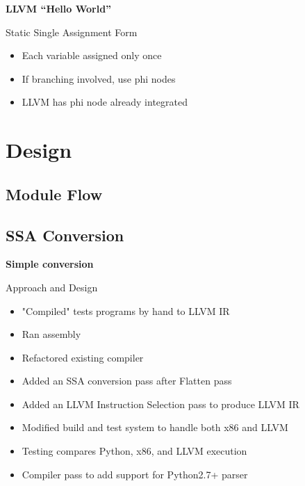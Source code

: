 \documentclass{beamer}
\begin{document}
\begin{frame}{\bf LLVM ``Hello World''}
  
\end{frame}

\begin{frame}{Static Single Assignment Form}
  \begin{itemize}
  \item<1->Each variable assigned only once
  \item<2->If branching involved, use phi nodes
  \item<3->LLVM has phi node already integrated
  \end{itemize}
\end{frame}

\section{Design}

\subsection{Module Flow}

\subsection{SSA Conversion}

\begin{frame}{\bf Simple conversion}
  
\pause
  
\end{frame}

\begin{frame}{Approach and Design}
  \begin{itemize}
  \item<1->"Compiled" tests programs by hand to LLVM IR
  \item<2->Ran assembly
  \item<3->Refactored existing compiler
  \item<4->Added an SSA conversion pass after Flatten pass
  \item<5->Added an LLVM Instruction Selection pass to produce LLVM IR
  \item<6->Modified build and test system to handle both x86 and LLVM
  \item<7->Testing compares Python, x86, and LLVM execution
  \item<8->Compiler pass to add support for Python2.7+ parser
  \end{itemize}
\end{frame}
\end{document}
